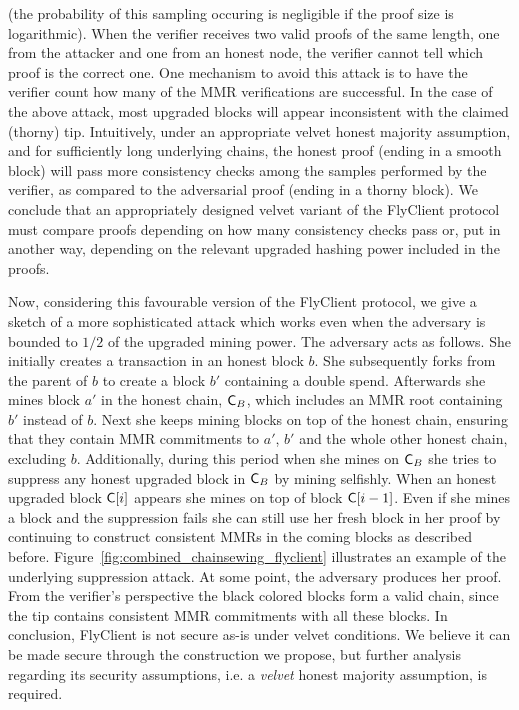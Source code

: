 	(the probability of this sampling occuring is negligible if the proof size is logarithmic). 
	When the verifier receives two valid proofs of the same length, one from the attacker and one from an honest node,
	the verifier cannot tell which proof is the correct one. 
	One mechanism to avoid this attack is to have the verifier count how many of
	the MMR verifications are successful. In the case of the above attack, most upgraded blocks will appear inconsistent with the claimed (thorny) tip.
	Intuitively, under an appropriate velvet honest majority assumption, and for sufficiently long underlying chains, the honest proof (ending in a smooth block)
	will pass more consistency checks among the samples performed
	by the verifier, as compared to the adversarial proof (ending in a thorny block).
	We conclude that an appropriately designed velvet variant of the FlyClient protocol must compare proofs depending on how many
	consistency checks pass or, put in another way, depending on the relevant upgraded hashing power included in the proofs. 

	Now, considering this favourable version of the FlyClient protocol, we give a sketch of a more sophisticated attack which works
	even when the adversary is bounded to $1/2$ of the upgraded mining power.
    The adversary acts as follows.
		She initially creates a transaction in an honest block $b$. She subsequently forks from the parent of $b$ to create a block $b'$ containing
		a double spend.
    Afterwards she mines block $a'$ in the honest chain, $\mathsf{C}_B$, which includes an MMR root containing $b'$ instead of $b$.
    Next she keeps mining blocks on top of the honest chain, ensuring that they contain MMR commitments to
		$a'$, $b'$ and the whole other honest chain, excluding $b$.
    Additionally, during this period when she mines on $\mathsf{C}_B$ she tries to suppress any honest upgraded block in $\mathsf{C}_B$ by mining selfishly.
    When an honest upgraded block $\mathsf{C}[i]$ appears she mines on top of block $\mathsf{C}[i-1]$.
    Even if she mines a block and the suppression fails she can still use her fresh block in her proof by continuing to construct consistent MMRs
    in the coming blocks as described before.
		Figure~\ref{fig:combined_chainsewing_flyclient} illustrates an example of the underlying suppression attack.
    At some point, the adversary produces her proof.
    From the verifier's perspective the black colored blocks form a valid chain,
    since the tip contains consistent MMR commitments with all these blocks.
	In conclusion, FlyClient is not secure as-is under velvet conditions. We believe it can be made secure through the construction we propose,
	but further analysis regarding its security assumptions, i.e. a \emph{velvet} honest majority assumption, is required.

